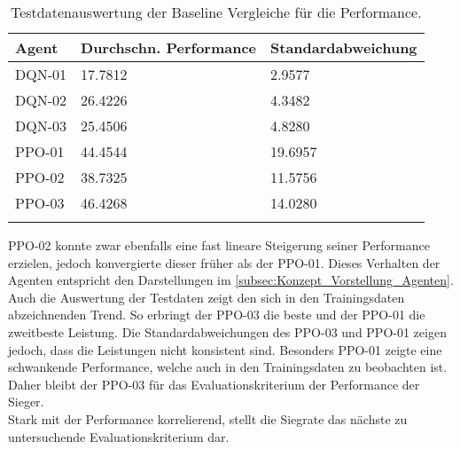 \begin{longtable}[H]{|p{4.5cm}|p{4.5cm}|p{4.5cm}|}
	\hline
	Agent & Durchschn. Performance & Standardabweichung \\
	\hline
	DQN-01 & 17.7812 & 2.9577 \\
	\hline
	DQN-02 & 26.4226 & 4.3482 \\
	\hline
	DQN-03 & 25.4506 & 4.8280 \\
	\hline
	PPO-01 & 44.4544 & 19.6957 \\
	\hline
	PPO-02 & 38.7325 & 11.5756 \\
	\hline
	PPO-03 & 46.4268 & 14.0280 \\
	\hline
\caption{Testdatenauswertung der Baseline Vergleiche für die Performance.}
\label{tab:Evaluation_Testdaten_Performance} 
\end{longtable}
PPO-02 konnte zwar ebenfalls eine fast lineare Steigerung seiner Performance erzielen, jedoch konvergierte dieser früher als der PPO-01.
Dieses Verhalten der Agenten entspricht den Darstellungen im \autoref{subsec:Konzept_Vorstellung_Agenten}.
Auch die Auswertung der Testdaten  zeigt den sich in den Trainingsdaten abzeichnenden Trend. So erbringt der PPO-03 die beste und der PPO-01 die zweitbeste Leistung. Die Standardabweichungen des PPO-03 und PPO-01 zeigen jedoch, dass die Leistungen nicht konsistent sind. Besonders PPO-01 zeigte eine schwankende Performance, welche auch in den Trainingsdaten  zu beobachten ist.
Daher bleibt der PPO-03 für das Evaluationskriterium der Performance der Sieger.\\
Stark mit der Performance korrelierend, stellt die Siegrate das nächste zu untersuchende Evaluationskriterium dar.

